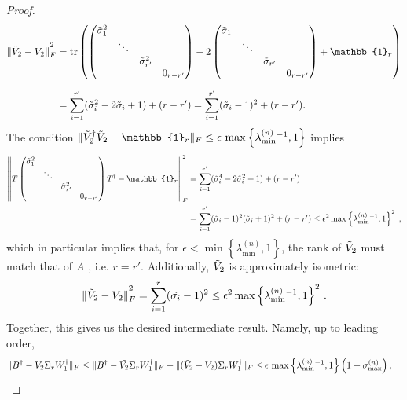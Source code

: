 \begin{proof}
\begin{align*}
\|\Tilde{V}_2-V_2\|_F^{\textstyle ^2} & =\operatorname{tr}\left(
\begin{pmatrix}
\Tilde{\sigma}_1^2&&&\\
&\ddots&&\\
&&\Tilde{\sigma}_{r'}^2&\\
&&& 0_{r-r'}
\end{pmatrix} -2
\begin{pmatrix}
\Tilde{\sigma}_1&&&\\
&\ddots&&\\
&&\Tilde{\sigma}_{r'}&\\
&&& 0_{r-r'}
\end{pmatrix}+\mathbb{1}_r\right)\\[0.5em] &  =\sum_{i=1}^{r'}(\Tilde{\sigma}_i^2-2\Tilde{\sigma}_i+1) + (r-r') =\sum_{i=1}^{r'}(\Tilde{\sigma}_i-1)^2+(r-r').
\end{align*}
The condition $\|\Tilde{V}_2^{\dag}\Tilde{V}_2 -\mathbb{1}_r\|_F\leq\epsilon\thinspace\operatorname{max}\left\{\lambda_{\text{min}}^{(n)}{}^{-1},1\right\}$ implies
\begin{align*}
\left\|T
\begin{pmatrix}
\Tilde{\sigma}_1^2&&& \\
&\ddots&& \\
&&\Tilde{\sigma}_{r'}^2& \\
&&&0_{r-r'}
\end{pmatrix}T^{\dag}-\mathbb{1}_r\right\|_F^2 & =\sum_{i=1}^{r'}(\Tilde{\sigma}_i^4-2\Tilde{\sigma}_i^2+1) + (r-r') \\
& = \sum_{i=1}^{r'}(\Tilde{\sigma}_i-1)^2(\Tilde{\sigma}_i+1)^2 + (r-r')\leq \epsilon^2\operatorname{max}\left\{\lambda_{\text{min}}^{(n)}{}^{-1},1\right\}^2\;,
\end{align*}
which in particular implies that, for $\epsilon<\operatorname{min}\left\{\lambda_{\text{min}}^{(n)},1\right\}$, the rank of $\Tilde{V}_2$ must match that of $A^{\dag}$, i.e. $r=r'$. Additionally, $\Tilde{V}_2$ is approximately isometric:
\begin{equation*}
\|\Tilde{V}_2-V_2\|_F^{\textstyle ^2} = \sum_{i=1}^r(\Tilde{\sigma_i}-1)^2\leq\epsilon^2\operatorname{max}\left\{\lambda_{\text{min}}^{(n)}{}^{-1},1\right\}^2\thinspace.
\end{equation*}
Together, this gives us the desired intermediate result. Namely, up to leading order, 
\begin{align*}
\|B^{\dag}-V_2\Sigma_r W_1^{\dag}\|_F\leq \|B^{\dag}-\Tilde{V_2}\Sigma_r W_1^{\dag}\|_F + \|(\Tilde{V}_2-V_2)\Sigma_r W_1^{\dag}\|_F \leq & \thinspace\epsilon\thinspace\operatorname{max}\left\{\lambda_{\text{min}}^{(n)}{}^{-1},1\right\}\left(1+\sigma_{\text{max}}^{(n)}\right),

\end{align*}
\end{proof}
